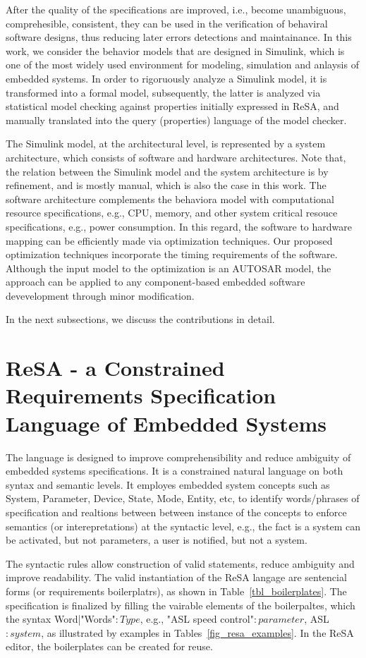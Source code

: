 After the quality of the specifications are improved, i.e., become unambiguous,  comprehesible, consistent, they can be used in the verification of behaviral software designs, thus reducing later errors detections and maintainance. In this work, we consider the behavior models that are designed in Simulink, which is one of the most widely used environment for modeling, simulation and anlaysis of embedded systems. In order to rigoruously analyze a Simulink model, it is transformed into a formal model, subsequently, the latter is analyzed via statistical model checking against properties initially expressed in ReSA, and manually translated into the query (properties) language of the model checker.

The Simulink model, at the architectural level, is represented by a system architecture, which consists of software and hardware architectures. Note that, the relation between the Simulink model and the system architecture is by refinement, and is mostly manual, which is also the case in this work. The software architecture complements the behaviora model with computational resource specifications, e.g., CPU, memory, and other system critical resouce specifications, e.g., power consumption. In this regard, the software to hardware mapping can be efficiently made via optimization techniques. Our proposed optimization techniques incorporate the timing requirements of the software. Although the input model to the optimization is an AUTOSAR model, the approach can be applied to any component-based embedded software devevelopment through minor modification. 

In the next subsections, we discuss the contributions in detail.
\section{ReSA - a Constrained Requirements Specification Language of Embedded Systems}\label{rc_resa}
The language is designed to improve comprehensibility and reduce ambiguity of embedded systems specifications. It is a constrained natural language on both syntax and semantic levels. It employes embedded system concepts such as System, Parameter, Device, State, Mode, Entity, etc, to identify words/phrases of specification and realtions between between instance of the concepts to enforce semantics (or interepretations) at the syntactic level, e.g., the fact is a system can be activated, but not parameters, a user is notified, but not a system. 

The syntactic rules allow construction of valid statements, reduce ambiguity and improve readability. The valid instantiation of the ReSA langage are sentencial forms (or requirements boilerplatrs), as shown in Table~\ref{tbl_boilerplates}. The specification is finalized by filling the vairable elements of the boilerpaltes, which the syntax {\small Word|"Words"}$:Type$, e.g., "ASL speed control"$:parameter$, ASL$:system$, as illustrated by examples in Tables~\ref{fig_resa_examples}. In the ReSA editor, the boilerplates can be created for reuse.
